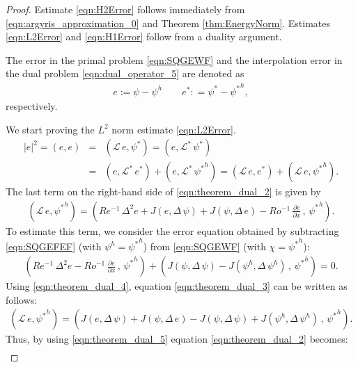 \begin{proof}
Estimate \eqref{eqn:H2Error} follows immediately from \eqref{eqn:argyris_approximation_0} and Theorem \ref{thm:EnergyNorm}.
Estimates \eqref{eqn:L2Error} and \eqref{eqn:H1Error} follow from a duality argument.

The error in the primal problem \eqref{eqn:SQGEWF} and the interpolation error in the dual problem  \eqref{eqn:dual_operator_5} are denoted as
\begin{eqnarray}
e
:= \psi
- \psi^h
\qquad
e^*
: = \psi^*
- {\psi^*}^h ,
\label{eqn:theorem_dual_1}
\end{eqnarray}
respectively.

We start proving the $L^2$ norm estimate \eqref{eqn:L2Error}.
\begin{eqnarray}
|e|^2
= (e , e)
&=& (\mathcal{L} \, e , \psi^*)
= (e , \mathcal{L}^* \, \psi^*)
\nonumber \\
&=& (e , \mathcal{L}^* \, e^*)
+ (e , \mathcal{L}^* \, {\psi^*}^h)
= (\mathcal{L} \, e , e^*)
+ (\mathcal{L} \, e , {\psi^*}^h) .
\label{eqn:theorem_dual_2}
\end{eqnarray}
The last term on the right-hand side of \eqref{eqn:theorem_dual_2} is given by
\begin{eqnarray}
(\mathcal{L} \, e , {\psi^*}^h)
= \left(
Re^{-1} \, \Delta^2 e
+ J(e , \Delta \, \psi)
+ J(\psi , \Delta \, e)
- Ro^{-1} \, \frac{\partial e}{\partial x}
 \, , \,
{\psi^*}^h
\right) .
\label{eqn:theorem_dual_3}
\end{eqnarray}
To estimate this term, we consider the error equation obtained by subtracting \eqref{eqn:SQGEFEF} (with $\psi^h= {\psi^*}^h$) from \eqref{eqn:SQGEWF} (with $\chi = {\psi^*}^h$):
\begin{eqnarray}
\left(
Re^{-1} \, \Delta^2 e
- Ro^{-1} \, \frac{\partial e}{\partial x}
 \, , \,
{\psi^*}^h
\right)
+ \left(
 J(\psi , \Delta \, \psi)
- J(\psi^h , \Delta \, \psi^h)
 \, , \,
{\psi^*}^h
\right)
= 0 .
\label{eqn:theorem_dual_4}
\end{eqnarray}
Using \eqref{eqn:theorem_dual_4}, equation \eqref{eqn:theorem_dual_3} can be written as follows:
\begin{eqnarray}
(\mathcal{L} \, e , {\psi^*}^h)
= \left(
 J(e , \Delta \, \psi)
+ J(\psi , \Delta \, e)
- J(\psi , \Delta \, \psi)
+ J(\psi^h , \Delta \, \psi^h)
 \, , \,
{\psi^*}^h
\right) .
\label{eqn:theorem_dual_5}
\end{eqnarray}
Thus, by using \eqref{eqn:theorem_dual_5} equation \eqref{eqn:theorem_dual_2} becomes:
\begin{eqnarray}

\end{eqnarray}
\end{proof}
